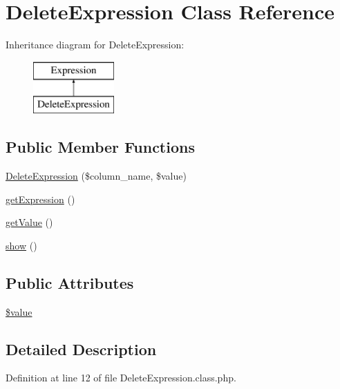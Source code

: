 \hypertarget{classDeleteExpression}{}\section{Delete\+Expression Class Reference}
\label{classDeleteExpression}
Inheritance diagram for Delete\+Expression\+:\begin{figure}[H]
\begin{center}
\leavevmode
\includegraphics[height=2.000000cm]{classDeleteExpression}
\end{center}
\end{figure}
\subsection*{Public Member Functions}
\begin{DoxyCompactItemize}
\item 
\hyperlink{classDeleteExpression_a1749423fab43333921d29c288a5c1b89}{Delete\+Expression} (\$column\+\_\+name, \$value)
\item 
\hyperlink{classDeleteExpression_acf2477afffe27b73797829c852431aec}{get\+Expression} ()
\item 
\hyperlink{classDeleteExpression_a37759c2867e64b62368539706fdf9a43}{get\+Value} ()
\item 
\hyperlink{classDeleteExpression_a6e7d4bdf884830a90e0ed0aba7619f67}{show} ()
\end{DoxyCompactItemize}
\subsection*{Public Attributes}
\begin{DoxyCompactItemize}
\item 
\hyperlink{classDeleteExpression_a8e5b6ee335281d42c6e40a462b83cf64}{\$value}
\end{DoxyCompactItemize}


\subsection{Detailed Description}


Definition at line 12 of file Delete\+Expression.\+class.\+php.



